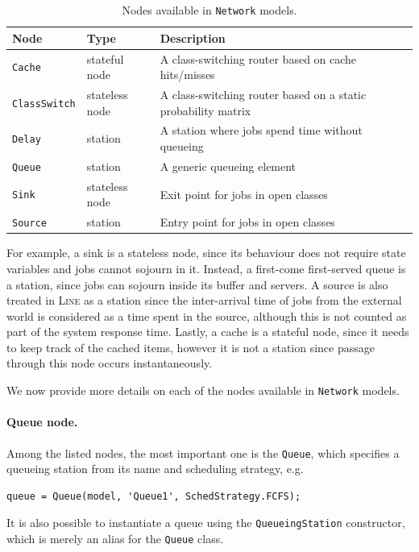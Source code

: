 \begin{table}[h!]
\caption{Nodes available in \texttt{Network} models.}
\begin{tabular}{|l|l|p{9.7cm}|}
\hline
{Node} & {Type} & {Description} \\
\hline
\texttt{Cache} & stateful node & A class-switching router based on cache hits/misses\\
\texttt{ClassSwitch} & stateless node & A class-switching router based on a static probability matrix\\
\texttt{Delay} & station & A station where jobs spend time without queueing\\
\texttt{Queue} & station & A generic queueing element\\
\texttt{Sink} & stateless node & Exit point for jobs in open classes\\
\texttt{Source} & station & Entry point for jobs in open classes\\
\hline
\end{tabular}
\end{table}

For example, a sink is a stateless node, since its behaviour does not require state variables and jobs cannot sojourn in it. Instead, a first-come first-served queue is a station, since jobs can sojourn inside its buffer and servers. A source is also treated in \textsc{Line} as a station since the inter-arrival time of jobs from the external world is considered as a time spent in the source, although this is not counted as part of the system response time.
Lastly, a cache is a stateful node, since it needs to keep track of the cached items, however it is not a station since passage through this node occurs instantaneously.

We now provide more details on each of the nodes available in \texttt{Network} models.
\paragraph{Queue node.}
Among the listed nodes, the most important one is the \texttt{Queue}, which specifies a queueing station from its name and scheduling strategy, e.g.
\begin{lstlisting}
queue = Queue(model, 'Queue1', SchedStrategy.FCFS);
\end{lstlisting}
It is also possible to instantiate a queue using the \texttt{QueueingStation} constructor, which is merely an alias for the \texttt{Queue} class.

